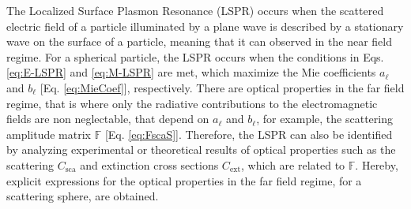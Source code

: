 
The Localized Surface Plasmon Resonance (LSPR) occurs when the scattered electric field of a particle illuminated by a plane wave is described by a stationary wave on the surface of a particle, meaning that it can observed in the near field regime. For a spherical particle, the LSPR occurs when the conditions in Eqs. \eqref{eq:E-LSPR} and \eqref{eq:M-LSPR} are met, which maximize the Mie coefficients  $a_\ell$ and $b_\ell$ [Eq. \eqref{eq:MieCoef}], respectively. There are optical properties in the far field regime, that is where only the radiative contributions to the electromagnetic fields are non neglectable, that depend on $a_\ell$ and $b_\ell$, for example,  the scattering amplitude matrix $\mathbb{F}$ [Eq. \eqref{eq:FscaS}]. Therefore, the LSPR can also be identified by analyzing experimental or theoretical results of optical properties such as the scattering $C_\text{sca}$ and extinction cross sections $C_\text{ext}$, which are related to $\mathbb{F}$.  Hereby, explicit expressions for the optical properties in the far field regime, for a scattering sphere, are obtained.

